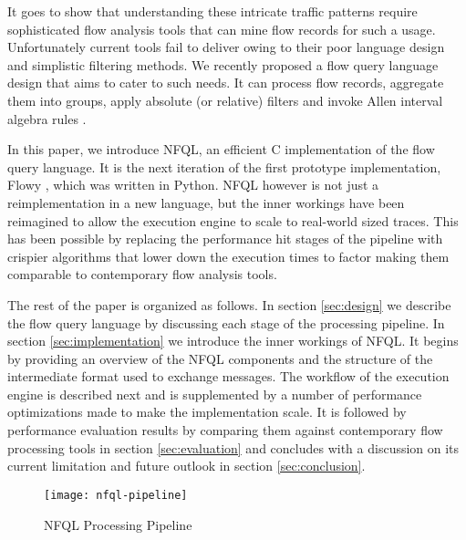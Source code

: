 It goes to show that understanding these intricate traffic patterns require
sophisticated flow analysis tools that can mine flow records for such a usage.
Unfortunately current tools fail to deliver owing to their poor language
design and simplistic filtering methods.  We recently proposed a flow query
language design \cite{vmarinov:thesis:2009} that aims to cater to such needs.
It can process flow records, aggregate them into groups, apply absolute (or
relative) filters and invoke Allen interval algebra rules \cite{fallen:1983}.

In this paper, we introduce \ac{NFQL}, an efficient C implementation of the
flow query language. It is the next iteration of the first prototype
implementation, Flowy \cite{kkanev:2010}, which was written in Python.
\ac{NFQL} however is not just a reimplementation in a new language, but
the inner workings have been reimagined to allow the execution engine to
scale to real-world sized traces. This has been possible by replacing the
performance hit stages of the pipeline with crispier algorithms that lower
down the execution times to factor making them comparable to contemporary
flow analysis tools.

The rest of the paper is organized as follows. In section \ref{sec:design} we
describe the flow query language by discussing each stage of the processing
pipeline. In section \ref{sec:implementation} we introduce the inner workings
of \ac{NFQL}. It begins by providing an overview of the \ac{NFQL} components
and the structure of the intermediate format used to exchange messages. The
workflow of the execution engine is described next and is supplemented by a
number of performance optimizations made to make the implementation scale. It
is followed by performance evaluation results by comparing them against
contemporary flow processing tools in section \ref{sec:evaluation} and
concludes with a discussion on its current limitation and future outlook in
section \ref{sec:conclusion}.

\begin{figure*}[!t]
\centering
\texttt{[image: nfql-pipeline]}
\caption{NFQL Processing Pipeline \cite{vmarinov:2009}}
\label{fig:nfql-pipeline}
\end{figure*}
